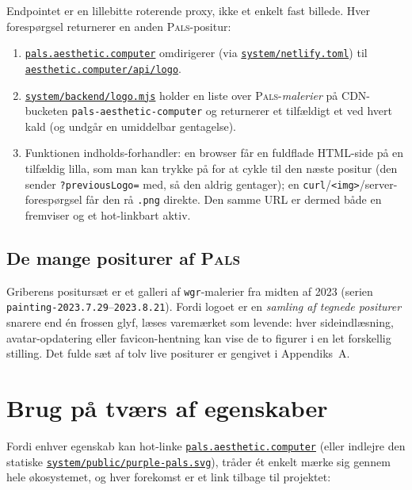 \documentclass[10pt,letterpaper,twocolumn]{article}
\newcommand{\pals}{\textsc{Pals}}
\newcommand{\repofile}[1]{\href{https://github.com/whistlegraph/aesthetic-computer/blob/main/#1}{\texttt{#1}}}
\begin{document}
Endpointet er en lillebitte roterende proxy, ikke et enkelt fast billede.
Hver forespørgsel returnerer en anden \pals{}-positur:

\begin{enumerate}
  \item \href{https://pals.aesthetic.computer}{\texttt{pals.aesthetic.computer}}
        omdirigerer (via \repofile{system/netlify.toml}) til
        \href{https://aesthetic.computer/api/logo}{\texttt{aesthetic.computer/api/logo}}.
  \item \repofile{system/backend/logo.mjs} holder en liste over
        \pals{}-\emph{malerier} på CDN-bucketen
        \texttt{pals-aesthetic-computer} og returnerer et tilfældigt et
        ved hvert kald (og undgår en umiddelbar gentagelse).
  \item Funktionen indholds-forhandler: en browser får en fuldflade
        HTML-side på en tilfældig lilla, som man kan trykke på for at cykle
        til den næste positur (den sender \texttt{?previousLogo=} med, så
        den aldrig gentager); en \texttt{curl}/\texttt{<img>}/server-forespørgsel
        får den rå \texttt{.png} direkte. Den samme URL er dermed både en
        fremviser og et hot-linkbart aktiv.
\end{enumerate}

\subsection{De mange positurer af \pals{}}

Griberens positursæt er et galleri af \texttt{wgr}-malerier fra
midten af 2023 (serien \texttt{painting-2023.7.29}--\texttt{2023.8.21}).
Fordi logoet er en \emph{samling af tegnede positurer} snarere end én
frossen glyf, læses varemærket som levende: hver sideindlæsning,
avatar-opdatering eller favicon-hentning kan vise de to figurer i en let
forskellig stilling. Det fulde sæt af tolv live positurer er gengivet i
Appendiks~A.

\section{Brug på tværs af egenskaber}

Fordi enhver egenskab kan hot-linke
\href{https://pals.aesthetic.computer}{\texttt{pals.aesthetic.computer}}
(eller indlejre den statiske
\repofile{system/public/purple-pals.svg}), tråder ét enkelt mærke sig
gennem hele økosystemet, og hver forekomst er et link tilbage til projektet:
\end{document}
